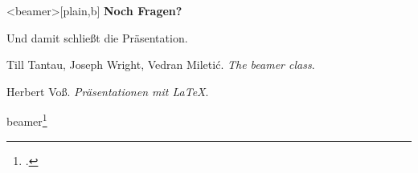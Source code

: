 \begin{lfgwcode}{}

\begin{frame}<beamer>[plain,b] %
  \huge\bfseries\color{structure!15} Noch Fragen?
  \vspace{0.3cm} %
\end{frame}

\end{lfgwcode}

Und damit schließt die Präsentation.

\begin{lfgwcode}{}

\end{lfgwcode}


\begin{thebibliography}{10}
      
   Till Tantau, Joseph Wright, Vedran Miletić.                    
      \newblock \emph{The beamer class}.                                        

   Herbert Voß.              
      \newblock \emph{Präsentationen mit LaTeX}.                                        

\end{thebibliography}

beamer\footcite{voss:praesentationen}



